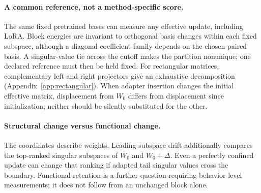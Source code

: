 \paragraph{A common reference, not a method-specific score.}
The same fixed pretrained bases can measure any effective update, including LoRA. Block energies are invariant to orthogonal basis changes within each fixed subspace, although a diagonal coefficient family depends on the chosen paired basis. A singular-value tie across the cutoff makes the partition nonunique; one declared reference must then be held fixed. For rectangular matrices, complementary left and right projectors give an exhaustive decomposition (Appendix~\ref{app:rectangular}). When adapter insertion changes the initial effective matrix, displacement from $W_0$ differs from displacement since initialization; neither should be silently substituted for the other.

\paragraph{Structural change versus functional change.}
The coordinates describe weights. Leading-subspace drift additionally compares the top-ranked singular subspaces of $W_0$ and $W_0+\Delta$. Even a perfectly confined update can change that ranking if adapted tail singular values cross the boundary. Functional retention is a further question requiring behavior-level measurements; it does not follow from an unchanged block alone.
